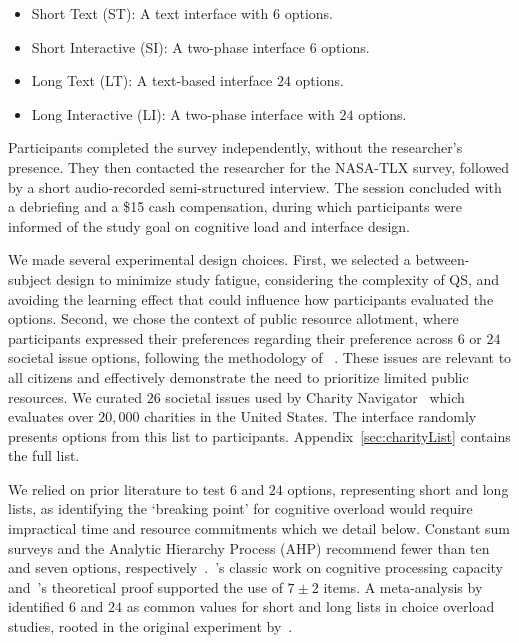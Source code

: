 \begin{itemize}
    \item Short Text (ST): A text interface with $6$ options.
    \item Short Interactive (SI): A two-phase interface $6$ options.
    \item Long Text (LT): A text-based interface $24$ options.
    \item Long Interactive (LI): A two-phase interface with $24$ options.
\end{itemize}

Participants completed the survey independently, without the researcher's presence. They then contacted the researcher for the NASA-TLX survey, followed by a short audio-recorded semi-structured interview. The session concluded with a debriefing and a \$15 cash compensation, during which participants were informed of the study goal on cognitive load and interface design.

We made several experimental design choices. First, we selected a between-subject design to minimize study fatigue, considering the complexity of QS, and avoiding the learning effect that could influence how participants evaluated the options. Second, we chose the context of public resource allotment, where participants expressed their preferences regarding their preference across $6$ or $24$ societal issue options, following the methodology of ~\textcite{chengCanShowWhat2021}. These issues are relevant to all citizens and effectively demonstrate the need to prioritize limited public resources. We curated $26$ societal issues used by Charity Navigator~\cite{CharityNavigator2023} which evaluates over $20,000$ charities in the United States. The interface randomly presents options from this list to participants. Appendix~\ref{sec:charityList} contains the full list.

We relied on prior literature to test $6$ and $24$ options, representing short and long lists, as identifying the `breaking point' for cognitive overload would require impractical time and resource commitments which we detail below. Constant sum surveys and the Analytic Hierarchy Process (AHP) recommend fewer than ten and seven options, respectively~\cite{moroneyQuestionnaireDesignHow2019, saatyGroupDecisionMaking2013, saatyPrinciplesAnalyticHierarchy1987}.~\textcite{millerMagicalNumberSeven1956}'s classic work on cognitive processing capacity and~\textcite{saaty2003magic}'s theoretical proof supported the use of $7\pm2$ items. A meta-analysis by~\textcite{chernevChoiceOverloadConceptual2015} identified $6$ and $24$ as common values for short and long lists in choice overload studies, rooted in the original experiment by~\textcite{iyengarWhenChoiceDemotivating2000}.

